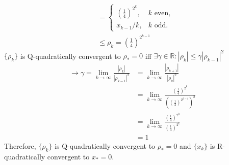 \documentclass[11pt]{article}
\begin{document}
\begin{description}
\begin{description}
\begin{equation*}
\begin{aligned}
            &= \begin{cases}
                (\frac{1}{4})^{2^k}, & k\text{ even,}\\
                x_{k-1}/k, & k\text{ odd.}
            \end{cases} \\
            &\leq \rho_k=(\frac{1}{4})^{2^{k-1}}
        \end{aligned}
    \end{equation*}
    $\{\rho_k\}$ is Q-quadratically convergent to $\rho_*=0$
    iff $\exists\gamma\in\mathbb{R}: |\rho_k| \leq \gamma|\rho_{k-1}|^2$
    \begin{equation*}
        \begin{aligned}
            \rightarrow \gamma = \lim_{k\rightarrow\infty} \frac{|\rho_k|}{|\rho_{k-1}|^2}
            &= \lim_{k\rightarrow\infty} \frac{|\rho_{k+1}|}{|\rho_k|^2} \\
            &= \lim_{k\rightarrow\infty} \frac{(\frac{1}{4})^{2^k}}{((\frac{1}{4})^{2^{k-1}})^2} \\
            &= \lim_{k\rightarrow\infty} \frac{(\frac{1}{4})^{2^k}}{(\frac{1}{4})^{2^k}} \\
            &= 1
        \end{aligned}
    \end{equation*}
    Therefore, $\{\rho_k\}$ is Q-quadratically convergent to $\rho_*=0$ and
    $\{x_k\}$ is R-quadratically convergent to $x_*=0$. \\

\end{description}


\end{description}
\end{document}
